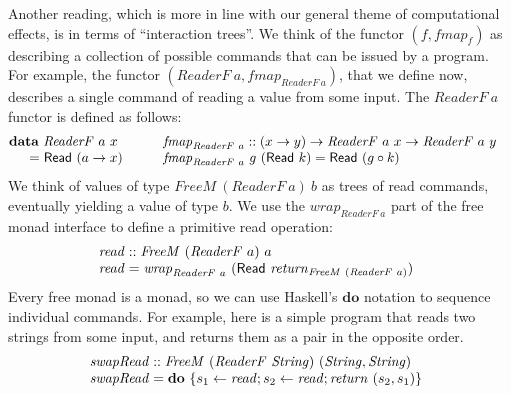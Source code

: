 \documentclass{jfp1}
\newcommand{\kw}[1]{\textbf{#1}}
\begin{document}
Another reading, which is more in line with our general theme of
computational effects, is in terms of ``interaction trees''. We think
of the functor $(f, \mathit{fmap}_f)$ as describing a collection of
possible commands that can be issued by a program. For example, the
functor $(\mathit{ReaderF}~a, \mathit{fmap}_{\mathit{ReaderF}~a})$,
that we define now, describes a single command of reading a value from
some input. The $\mathit{ReaderF}~a$ functor is defined as follows:
\begin{displaymath}
  \begin{array}{@{}l@{\hspace{2em}}l}
    \begin{array}{@{}l}
      \kw{data}~\mathit{ReaderF}~a~x \\
      \quad
      \begin{array}{c@{\hspace{0.3em}}l}
        = & \mathsf{Read}~(a \to x)
      \end{array}
    \end{array}
    &
    \begin{array}{@{}l}
      \mathit{fmap}_{\mathit{ReaderF}~a} :: (x \to y) \to \mathit{ReaderF}~a~x \to \mathit{ReaderF}~a~y \\
      \mathit{fmap}_{\mathit{ReaderF}~a}~g~(\mathsf{Read}~k) = \mathsf{Read}~(g \circ k)
    \end{array}
  \end{array}
\end{displaymath}
We think of values of type $\mathit{FreeM}~(\mathit{ReaderF}~a)~b$ as
trees of read commands, eventually yielding a value of type
$b$. We use the $\mathit{wrap}_{\mathit{ReaderF}~a}$ part of the free
monad interface to define a primitive read operation:
\begin{displaymath}
  \begin{array}{@{}l}
    \mathit{read} :: \mathit{FreeM}~(\mathit{ReaderF}~a)~a \\
    \mathit{read} = \mathit{wrap}_{\mathit{ReaderF}~a}~(\mathsf{Read}~\mathit{return}_{\mathit{FreeM}~(\mathit{ReaderF}~a)})
  \end{array}
\end{displaymath}
Every free monad is a monad, so we can use Haskell's $\kw{do}$
notation to sequence individual commands. For example, here is a
simple program that reads two strings from some input, and returns
them as a pair in the opposite order.
\begin{displaymath}
  \begin{array}{@{}l}
  \mathit{swapRead} :: \mathit{FreeM}~(\mathit{ReaderF}~\mathit{String})~(\mathit{String},\mathit{String}) \\
  \mathit{swapRead} = \kw{do}~\{ s_1 \leftarrow \mathit{read}; s_2 \leftarrow \mathit{read}; \mathit{return}~(s_2,s_1) \}
\end{array}
\end{displaymath}
\end{document}
